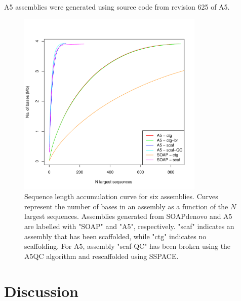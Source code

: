 \documentclass{bioinfo}
\begin{document}
A5 assemblies were generated using source code from revision 625 of A5.

\begin{figure}[t]
\includegraphics[width=3.5in]{volc_accum_plot.pdf}
\vspace{-1cm}
\caption{Sequence length accumulation curve for six assemblies. Curves represent the number of bases 
in an assembly as a function of the $N$ largest sequences. Assemblies generated from SOAPdenovo and A5 are labelled with "SOAP" and "A5", 
respectively. "scaf" indicates an assembly that has been scaffolded, while "ctg" indicates 
no scaffolding. For A5, assembly "scaf-QC" has been broken using the A5QC algorithm and rescaffolded using SSPACE. }\label{fig:03}
\end{figure}

\section{Discussion}
\end{document}
